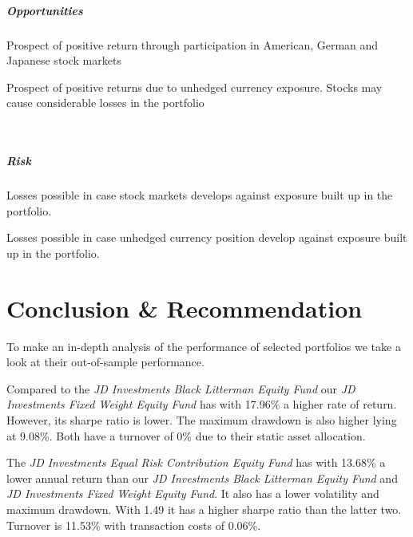 \documentclass[11pt, parskip=full, DIV=14]{scrreprt}
\begin{document}
\begin{minipage}[t]{0.49\textwidth}
  \paragraph{Opportunities}
  \begin{sit}
  \item Prospect of positive return through participation in American, German and Japanese stock markets
  \item Prospect of positive returns due to unhedged currency exposure. Stocks may cause considerable losses in the portfolio
  \end{sit}
\end{minipage}
~~
\begin{minipage}[t]{0.49\textwidth}
  \paragraph{Risk}
  \begin{sit}
  \item Losses possible in case stock markets develops against exposure built up in the portfolio.
  \item Losses possible in case unhedged currency position develop against exposure built up in the portfolio.
  \end{sit}
\end{minipage}

\chapter*{Conclusion \& Recommendation}
To make an in-depth analysis of the performance of selected portfolios we take a look at their out-of-sample performance.

Compared to the \textit{JD Investments Black Litterman Equity Fund} our \textit{JD Investments Fixed Weight Equity Fund} has with 17.96\% a higher rate of return. However, its sharpe ratio is lower. The maximum drawdown is also higher lying at 9.08\%. Both have a turnover of 0\% due to their static asset allocation.

The \textit{JD Investments Equal Risk Contribution Equity Fund} has with 13.68\% a lower annual return than our \textit{JD Investments Black Litterman Equity Fund} and \textit{JD Investments Fixed Weight Equity Fund}. It also has a lower volatility and maximum drawdown. With 1.49 it has a higher sharpe ratio than the latter two. Turnover is 11.53\% with transaction costs of 0.06\%. 
\end{document}
